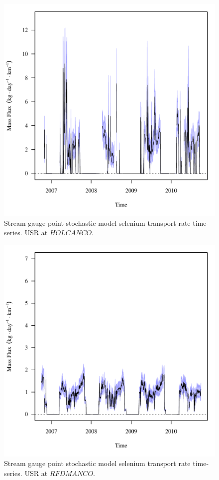 \begin{figure}[htbp]
	\begin{center}
	\includegraphics[width=6in]{"Figures/Results_USR/f HOL"}
	\caption{Stream gauge point stochastic model selenium transport rate time-series.  USR at $HOLCANCO$.}
	\end{center}
\end{figure}
\newpage

\begin{figure}[htbp]
	\begin{center}
	\includegraphics[width=6in]{"Figures/Results_USR/f RFD"}
	\caption{Stream gauge point stochastic model selenium transport rate time-series.  USR at $RFDMANCO$.}
	\end{center}
\end{figure}
\newpage

